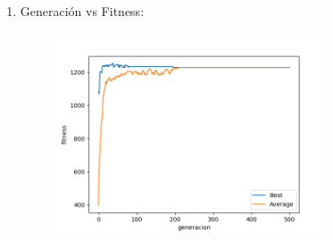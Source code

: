 \documentclass[11pt,letterpaper]{article}
\begin{document}
\begin{enumerate}[label=\alph*)]
        \begin{enumerate}[label=\arabic*.]
            \item Generación vs Fitness:
            \begin{figure}[H]
                \centering
                \includegraphics[width=8cm]{images/gen-vs-fitness.png}
                \label{fig:gen-vs-fit}
            \end{figure}
            

\end{enumerate}
\end{enumerate}
\end{document}
